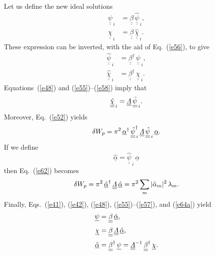 \documentclass[12pt,prb,aps,notitlepage]{revtex4-1}
\begin{document}
Let us define the new ideal solutions
\begin{align}\label{e57}
\underline{\underline{\psi}}_{\,i}&=\underline{\underline{\beta}}\,\underline{\underline{\hat{\psi}}}_{\,i},\\[0.5ex]
\underline{\underline{\chi}}_{\,i}&=\underline{\underline{\beta}}\,\underline{\underline{\hat{\chi}}}_{\,i}.\label{e58}
\end{align}
These expression can be inverted, with the aid of Eq.~(\ref{e56}), to give
\begin{align}
\underline{\underline{\hat{\psi}}}_{\,i}&=\underline{\underline{\beta}}^\dag\,\underline{\underline{\psi}}_{\,i},\\[0.5ex]
\underline{\underline{\hat{\chi}}}_{\,i}&=\underline{\underline{\beta}}^\dag\,\underline{\underline{\chi}}_{\,i}.
\end{align}
Equations~(\ref{e48}) and (\ref{e55})--(\ref{e58}) imply that
\begin{equation}
\underline{\underline{\hat{\chi}}}_{\,i}= \underline{\underline{{\mit\Lambda}}}\,\underline{\underline{\hat{\psi}}}_{\,i}.
\end{equation}
Moreover, Eq.~(\ref{e52}) yields
\begin{equation}\label{e62}
 \delta W_p= \pi^2\,\underline{\alpha}^\dag\,\underline{\underline{\hat{\psi}}}^{\dag}_{\,i}\,\underline{\underline{{\mit\Lambda}}}\,\underline{\underline{\hat{\psi}}}_{\,i}\,\underline{\alpha}.
 \end{equation}
 If we define
 \begin{equation}\label{e64a}
\underline{\hat{\alpha}} = \underline{\underline{\hat{\psi}}}_{\,i}\,\underline{\alpha}
\end{equation}
then Eq.~(\ref{e62}) becomes
\begin{equation}\label{e64}
 \delta W_p=\pi^2\, \underline{\hat{\alpha}}^\dag\,\underline{\underline{{\mit\Lambda}}}\,\underline{\hat{\alpha}}=\pi^2\sum_m |\hat{\alpha}_m|^2\,\lambda_m.
 \end{equation}
 Finally, Eqs.~(\ref{e41}), (\ref{e42}), (\ref{e48}), (\ref{e55})--(\ref{e57}), and (\ref{e64a}) yield
\begin{align}\label{e65}
\underline{\psi}&= \underline{\underline{\beta}}\,\underline{\hat{\alpha}},\\[0.5ex]
\underline{\chi}&= \underline{\underline{\beta}}\,\underline{\underline{\mit\Lambda}}\,\underline{\hat{\alpha}},\label{e66}\\[0.5ex]
\underline{\hat{\alpha}}&= \underline{\underline{\beta}}^\dag\,\underline{\psi}= \underline{\underline{\mit\Lambda}}^{-1}\,\underline{\underline{\beta}}^\dag\,
\underline{\chi}.
\end{align}
\end{document}
